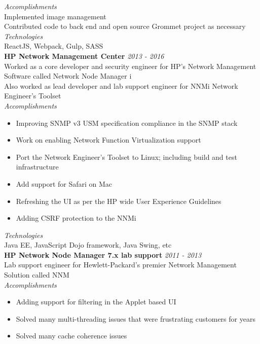 \documentclass[line,margin]{res}
\begin{document}
\begin{resume}
{\it{Accomplishments}}\\
Implemented image management\\
Contributed code to back end and open source Grommet project as necessary\\

{\it{Technologies}}\\
ReactJS, Webpack, Gulp, SASS\\


{\bf HP Network Management Center} \hfill {\it{2013 - 2016}}\\
Worked as a core developer and security engineer for HP's Network Management Software called Network Node Manager i\\
Also worked as lead developer and lab support engineer for NNMi Network Engineer's Toolset\\

{\it{Accomplishments}}\\
\begin{itemize}
\item Improving SNMP v3 USM specification compliance in the SNMP stack
\item Work on enabling Network Function Virtualization support
\item Port the Network Engineer's Toolset to Linux; including build and test infrastructure
\item Add support for Safari on Mac
\item Refreshing the UI as per the HP wide User Experience Guidelines
\item Adding CSRF protection to the NNMi
\end{itemize}

{\it{Technologies}}\\
Java EE, JavaScript Dojo framework, Java Swing, etc\\

{\bf HP Network Node Manager 7.x lab support} \hfill {\it{2011 - 2013}}\\
Lab support engineer for Hewlett-Packard's premier Network Management Solution called NNM\\

{\it{Accomplishments}}\\
\begin{itemize}
\item Adding support for filtering in the Applet based UI
\item Solved many multi-threading issues that were frustrating customers for years
\item Solved many cache coherence issues
\end{itemize}


\end{resume}
\end{document}

